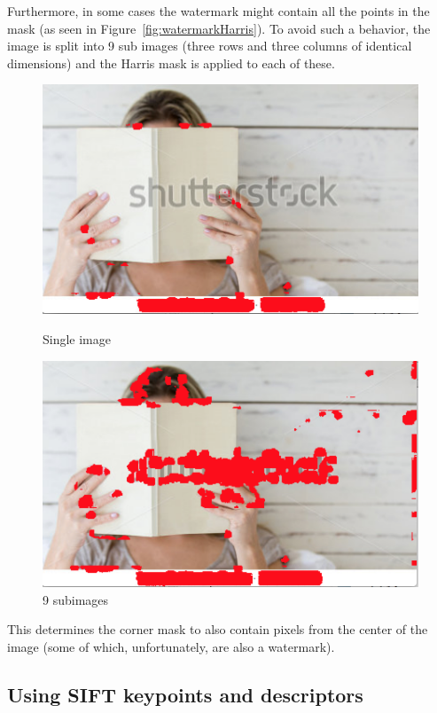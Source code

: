 Furthermore, in some cases the watermark might contain all the points in the mask (as seen in Figure~\ref{fig:watermarkHarris}). To avoid such a behavior, the image is split into 9 sub images (three rows and three columns of identical dimensions) and the Harris mask is applied to each of these.

\begin{figure}[ht!]
\centering
\begin{minipage}{.5\textwidth}
	\centering
	\includegraphics[width=.8\linewidth]{images/watermarkHarris.png}
	\caption{Single image}
	\label{fig:watermarkHarris}
\end{minipage}%
\begin{minipage}{.5\textwidth}
	\centering
	\includegraphics[width=.8\linewidth]{images/watermarkHarris9.png}
	\caption{9 subimages}
	\label{fig:watermarkHarris9}
\end{minipage}
\end{figure}

This determines the corner mask to also contain pixels from the center of the image (some of which, unfortunately, are also a watermark).


\subsection{Using SIFT keypoints and descriptors}

